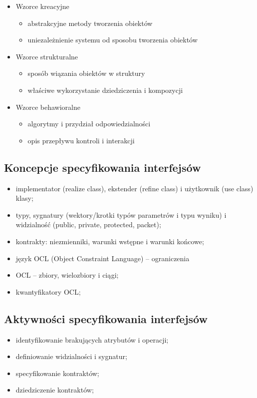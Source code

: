 \documentclass[a4paper]{article}
\begin{document}
\begin{itemize}
    \item Wzorce kreacyjne
    \begin{itemize}
        \item abstrakcyjne metody tworzenia obiektów
        \item uniezależnienie systemu od sposobu tworzenia obiektów
    \end{itemize}
    \item Wzorce strukturalne
    \begin{itemize}
        \item sposób wiązania obiektów w struktury
        \item właściwe wykorzystanie dziedziczenia i kompozycji
    \end{itemize}
    \item Wzorce behawioralne
    \begin{itemize}
        \item algorytmy i przydział odpowiedzialności
        \item opis przepływu kontroli i interakcji
    \end{itemize}
\end{itemize}

\subsection{Koncepcje specyfikowania interfejsów}
\begin{itemize}
    \item implementator (realize class), ekstender (refine class) i użytkownik (use class) klasy;
    \item typy, sygnatury (wektory/krotki typów parametrów i typu wyniku) i widzialność (public, private, protected, packet);
    \item kontrakty: niezmienniki, warunki wstępne i warunki końcowe;
    \item język OCL (Object Constraint Language) – ograniczenia
    \item OCL – zbiory, wielozbiory i ciągi;
    \item kwantyfikatory OCL;
\end{itemize}

\subsection{Aktywności specyfikowania interfejsów}
\begin{itemize}
    \item identyfikowanie brakujących atrybutów i operacji;
    \item definiowanie widzialności i sygnatur;
    \item specyfikowanie kontraktów;
    \item dziedziczenie kontraktów;
\end{itemize}
\end{document}
